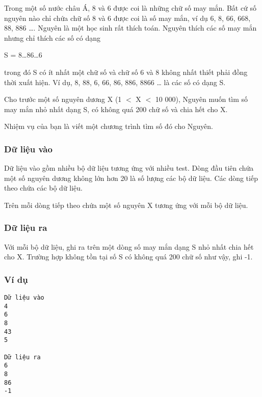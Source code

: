 



   Trong một số nước châu Á, 8 và 6 được coi là những chữ số may mắn. Bất cứ số nguyên nào chỉ chứa chữ số 8 và 6 được coi là số may mắn, ví dụ 6, 8, 66, 668, 88, 886 …. Nguyên là một học sinh rất thích toán. Nguyên thích các số may mắn nhưng chỉ thích các số có dạng  

   S = 8…86…6  

   trong đó S có ít nhất một chữ số và chữ số 6 và 8 không nhất thiết phải đồng thời xuất hiện. Ví dụ, 8, 88, 6, 66, 86, 886, 8866 … là các số có dạng S.  

   Cho trước một số nguyên dương X (1 $<$ X $<$ 10 000), Nguyên muốn tìm số may mắn nhỏ nhất dạng S, có không quá 200 chữ số và chia hết cho X.  

   Nhiệm vụ của bạn là viết một chương trình tìm số đó cho Nguyên.  

\subsubsection{   Dữ liệu vào  }

   Dữ liệu vào gồm nhiều bộ dữ liệu tương ứng với nhiều test. Dòng đầu tiên chứa một số nguyên dương không lớn hơn 20 là số lượng các bộ dữ liệu. Các dòng tiếp theo chứa các bộ dữ liệu.  

   Trên mỗi dòng tiếp theo chứa một số nguyên X tương ứng với mỗi bộ dữ liệu.  

\subsubsection{   Dữ liệu ra  }

   Với mỗi bộ dữ liệu, ghi ra trên một dòng số may mắn dạng S nhỏ nhất chia hết cho X. Trường hợp không tồn tại số S có không quá 200 chữ số như vậy, ghi -1.  

\subsubsection{   Ví dụ  }
\begin{verbatim}
Dữ liệu vào	
4
6
8
43
5	

Dữ liệu ra
6
8
86
-1
\end{verbatim}